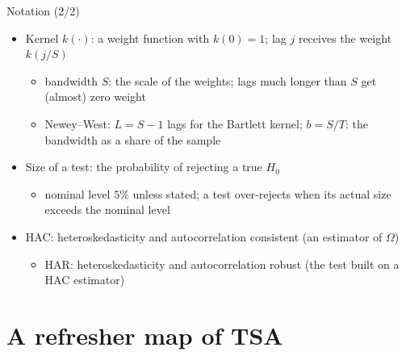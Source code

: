 \begin{frame}{Notation (2/2)}
\itemsize{\small}
\begin{itemize}
    \item Kernel $k(\cdot)$: a weight function with $k(0) = 1$; lag $j$ receives the weight $k(j/S)$
    \begin{itemize}
        \item bandwidth $S$: the scale of the weights; lags much longer than $S$ get (almost) zero weight
        \item Newey--West: $L = S - 1$ lags for the Bartlett kernel; $b = S/T$: the bandwidth as a share of the sample
    \end{itemize}
    \item Size of a test: the probability of rejecting a true $H_0$
    \begin{itemize}
        \item nominal level $5\%$ unless stated; a test over-rejects when its actual size exceeds the nominal level
    \end{itemize}
    \item HAC: heteroskedasticity and autocorrelation consistent (an estimator of $\Omega$)
    \begin{itemize}
        \item HAR: heteroskedasticity and autocorrelation robust (the test built on a HAC estimator)
    \end{itemize}
\end{itemize}
\end{frame}


\section{A refresher map of TSA}

